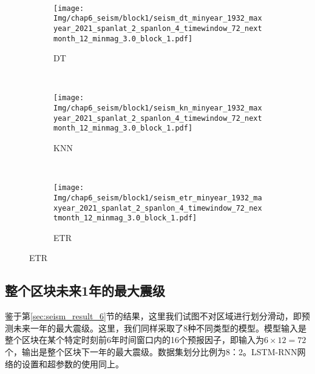 \begin{figure}[!htbp]
\begin{subfigure}[b]{0.45\textwidth}
    \vspace{-1cm}
    \label{fig:seism_gbr_minyear_1932_maxyear_2021_spanlat_2_spanlon_4_timewindow_72_nextmonth_12_minmag_3.0_block_1}
  \end{subfigure}
  ~
  \begin{subfigure}[b]{0.45\textwidth}
    \caption{DT}
    \vspace{-0.2cm}
    \texttt{[image: Img/chap6\_seism/block1/seism\_dt\_minyear\_1932\_maxyear\_2021\_spanlat\_2\_spanlon\_4\_timewindow\_72\_nextmonth\_12\_minmag\_3.0\_block\_1.pdf]}
    \vspace{-1cm}
    \label{fig:seism_dt_minyear_1932_maxyear_2021_spanlat_2_spanlon_4_timewindow_72_nextmonth_12_minmag_3.0_block_1}
  \end{subfigure}
  \\
  \begin{subfigure}[b]{0.45\textwidth}
    \caption{KNN}
    \vspace{-0.2cm}
    \texttt{[image: Img/chap6\_seism/block1/seism\_kn\_minyear\_1932\_maxyear\_2021\_spanlat\_2\_spanlon\_4\_timewindow\_72\_nextmonth\_12\_minmag\_3.0\_block\_1.pdf]}
    \vspace{-1cm}
    \label{fig:seism_knn_minyear_1932_maxyear_2021_spanlat_2_spanlon_4_timewindow_72_nextmonth_12_minmag_3.0_block_1}
  \end{subfigure}
  ~
  \begin{subfigure}[b]{0.45\textwidth}
    \caption{ETR}
    \vspace{-0.2cm}
    \texttt{[image: Img/chap6\_seism/block1/seism\_etr\_minyear\_1932\_maxyear\_2021\_spanlat\_2\_spanlon\_4\_timewindow\_72\_nextmonth\_12\_minmag\_3.0\_block\_1.pdf]}
    \vspace{-1cm}
    \label{fig:seism_etr_minyear_1932_maxyear_2021_spanlat_2_spanlon_4_timewindow_72_nextmonth_12_minmag_3.0_block_1}
  \end{subfigure}
  \label{fig:seism_minyear_1932_maxyear_2021_spanlat_2_spanlon_4_timewindow_72_nextmonth_12_minmag_3.0_block_1}
\end{figure}


\subsection{整个区块未来1年的最大震级}\label{sec:seism_result_1}

鉴于第\ref{sec:seism_result_6}节的结果，这里我们试图不对区域进行划分滑动，即预测未来一年的最大震级。这里，我们同样采取了8种不同类型的模型。模型输入是整个区块在某个特定时刻前6年时间窗口内的16个预报因子，即输入为$6\times 12=72$个，输出是整个区块下一年的最大震级。数据集划分比例为8：2。LSTM-RNN网络的设置和超参数的使用同上。

